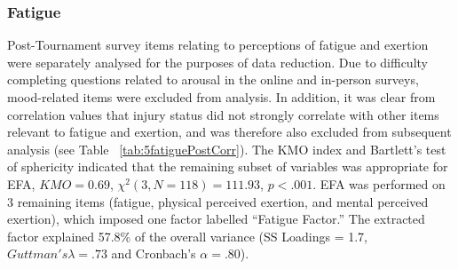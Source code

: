 





\newpage
{} %
\begin{landscape}
    
    
    
    

    \clearpage
    
    
    

    \clearpage
\end{landscape}
\restoregeometry






\subsubsection{Fatigue \label{app8:fatigueEFA}}

Post-Tournament survey items relating to perceptions of fatigue and exertion were separately analysed for the purposes of data reduction.  Due to difficulty completing questions related to arousal in the online and in-person surveys, mood-related items were excluded from analysis.  In addition, it was clear from correlation values that injury status did not strongly correlate with other items relevant to fatigue and exertion, and was therefore also excluded from subsequent analysis (see Table ~\ref{tab:5fatiguePostCorr}).  The KMO index and Bartlett's test of sphericity indicated that the remaining subset of variables was appropriate for EFA, $KMO =  0.69$, $\chi^2(3, N = 118) = 111.93$, $p < .001$. EFA was performed on 3 remaining items (fatigue, physical perceived exertion, and mental perceived exertion), which imposed one factor labelled ``Fatigue Factor.''  The extracted factor explained 57.8\% of the overall variance (SS Loadings = 1.7, $Guttman's\lambda =.73$ and Cronbach's $\alpha = .80$).

